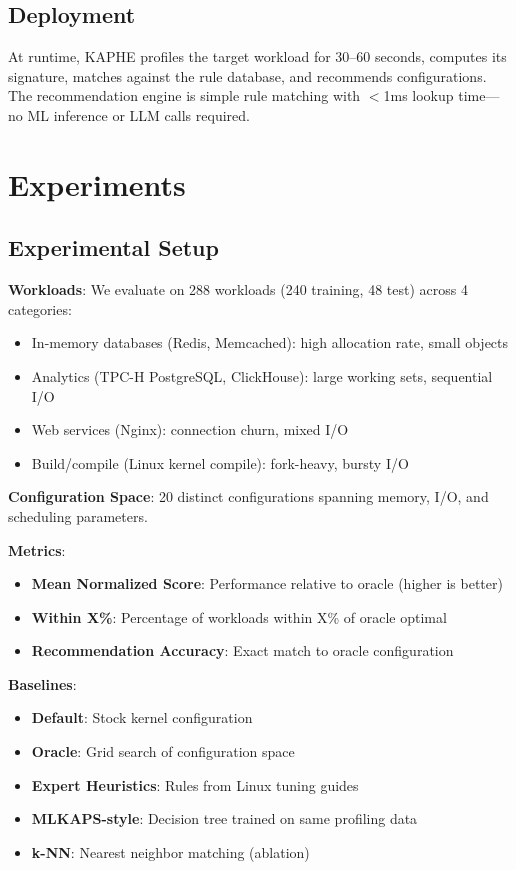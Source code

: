 \documentclass[11pt,a4paper]{article}
\begin{document}
\subsection{Deployment}

At runtime, KAPHE profiles the target workload for 30--60 seconds, computes its signature, matches against the rule database, and recommends configurations. The recommendation engine is simple rule matching with $<$1ms lookup time---no ML inference or LLM calls required.

\section{Experiments}
\label{sec:experiments}

\subsection{Experimental Setup}

\textbf{Workloads}: We evaluate on 288 workloads (240 training, 48 test) across 4 categories:
\begin{itemize}
    \item In-memory databases (Redis, Memcached): high allocation rate, small objects
    \item Analytics (TPC-H PostgreSQL, ClickHouse): large working sets, sequential I/O
    \item Web services (Nginx): connection churn, mixed I/O
    \item Build/compile (Linux kernel compile): fork-heavy, bursty I/O
\end{itemize}

\textbf{Configuration Space}: 20 distinct configurations spanning memory, I/O, and scheduling parameters.

\textbf{Metrics}:
\begin{itemize}
    \item \textbf{Mean Normalized Score}: Performance relative to oracle (higher is better)
    \item \textbf{Within X\%}: Percentage of workloads within X\% of oracle optimal
    \item \textbf{Recommendation Accuracy}: Exact match to oracle configuration
\end{itemize}

\textbf{Baselines}:
\begin{itemize}
    \item \textbf{Default}: Stock kernel configuration
    \item \textbf{Oracle}: Grid search of configuration space
    \item \textbf{Expert Heuristics}: Rules from Linux tuning guides
    \item \textbf{MLKAPS-style}: Decision tree trained on same profiling data
    \item \textbf{k-NN}: Nearest neighbor matching (ablation)
\end{itemize}
\end{document}
